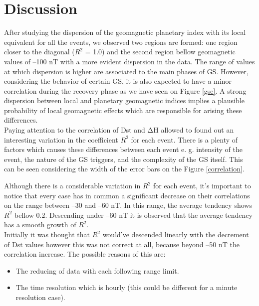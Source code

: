 \documentclass[a4paper, 11pt]{article}
\begin{document}
\section{Discussion}

After studying the dispersion of the geomagnetic planetary index with its local equivalent for all the events, we observed two regions are formed: one region closer to the diagonal ($R^2$ = 1.0) and the second region bellow geomagnetic values of –100 nT with a more evident dispersion in the data. The range of values at which dispersion is higher are associated to the main phases of GS. However, considering the behavior of certain GS, it is also expected to have a minor correlation during the recovery phase as we have seen on Figure \ref{gse}. A strong dispersion between local and planetary geomagnetic indices implies a plausible probability of local geomagnetic effects which are responsible for arising these differences. \\ 

Paying attention to the correlation of Dst and $\mathrm{\Delta H}$ allowed to found out an interesting variation in the coefficient $R^2$ for each event. There is a plenty of factors which causes these differences between each event e. g. intensity of the event, the nature of the GS triggers, and the complexity of the GS itself. This can be seen considering the width of the error bars on the Figure \ref{correlation}.\ 

Although there is a considerable variation in $R^2$ for each event, it's important to notice that every case has in common a significant decrease on their correlations on the range between –30 and –60 nT. In this range, the average tendency shows $R^2$ bellow 0.2. Descending under –60 nT it is observed that the average tendency has a smooth growth of $R^2$. \\ 

Initially it was thought that $R^2$ would've descended linearly with the decrement of Dst values however this was not correct at all, because beyond –50 nT the correlation increase. The possible reasons of this are: 

\begin{itemize}
    \item     The reducing of data with each following range limit. 
    \item     The time resolution which is hourly (this could be different for a minute resolution case). 
\end{itemize}
\end{document}
